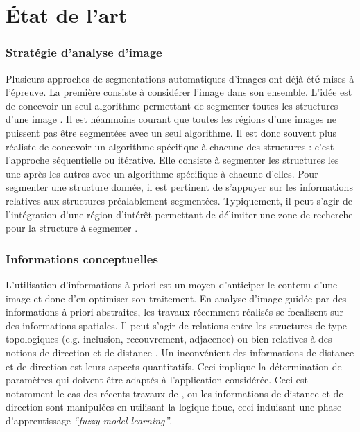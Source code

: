 
	  \section{État de l'art}
	  \label{sec:state_of_the_art}

		\subsubsection*{Stratégie d'analyse d'image}
	Plusieurs approches de segmentations automatiques d'images ont déjà ét{\bf é} mises à l'épreuve. La première consiste à considérer l'image dans son ensemble. L'idée est de concevoir un seul algorithme permettant de segmenter toutes les structures d'une image \citep[Moreno]{Moreno2008}\citep[Kobashi]{Kobashi1995}. Il est néanmoins courant que toutes les régions d'une images ne puissent pas être segmentées avec un seul algorithme. Il est donc souvent plus réaliste de concevoir un algorithme spécifique à chacune des structures : c'est l'approche séquentielle ou itérative. Elle consiste à segmenter les structures les une après les autres avec un algorithme spécifique à chacune d'elles. Pour segmenter une structure donnée, il est pertinent de s'appuyer sur les informations relatives aux structures préalablement segmentées. Typiquement, il peut s'agir de l'intégration d'une région d'intérêt permettant de délimiter une zone de recherche pour la structure à segmenter \citep[Hudelot]{Hudelot2008}\citep[Fasquel]{Fasquel2006}.


		\subsubsection*{Informations conceptuelles}
	L'utilisation d'informations à priori est un moyen d'anticiper le contenu d'une image et donc d'en optimiser son traitement. En analyse d'image guidée par des informations à priori abstraites, les travaux récemment réalisés se focalisent sur des informations spatiales. Il peut s'agir de relations entre les structures de type topologiques (e.g. inclusion, recouvrement, adjacence) \citep[Fasquel]{Fasquel2006}\citep[Egenhofer]{Egenhofer2009}\citep[Hudelot]{Hudelot2008} ou bien relatives à des notions de direction et de distance \citep[Hudelot]{Hudelot2008}. Un inconvénient des informations de distance et de direction est leurs aspects quantitatifs. Ceci implique la détermination de paramètres qui doivent être adaptés à l'application considérée. Ceci est notamment le cas des récents travaux de \citep[Hudelot]{Hudelot2008}, ou les informations de distance et de direction sont manipulées en utilisant la logique floue, ceci induisant une phase d'apprentissage \textit{``fuzzy model learning''}.


